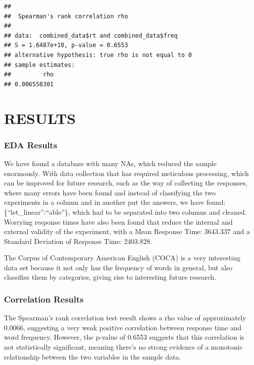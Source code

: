 \documentclass[
]{article}
\begin{document}
\begin{verbatim}
## 
##  Spearman's rank correlation rho
## 
## data:  combined_data$rt and combined_data$freq
## S = 1.6487e+10, p-value = 0.6553
## alternative hypothesis: true rho is not equal to 0
## sample estimates:
##         rho 
## 0.006558301
\end{verbatim}

\hypertarget{results}{%
\section{RESULTS}\label{results}}

\hypertarget{eda-results}{%
\subsubsection{EDA Results}\label{eda-results}}

We have found a database with many NAs, which reduced the sample
enormously. With data collection that has required meticulous
processing, which can be improved for future research, such as the way
of collecting the responses, where many errors have been found and
instead of classifying the two experiments in a column and in another
put the answers, we have found: \{``let\_linear'':``able''\}, which had
to be separated into two columns and cleaned. Worrying response times
have also been found that reduce the internal and external validity of
the experiment, with a Mean Response Time: 3643.337 and a Standard
Deviation of Response Time: 2403.828.

The Corpus of Contemporary American English (COCA) is a very interesting
data set because it not only has the frequency of words in general, but
also classifies them by categories, giving rise to interesting future
research.

\hypertarget{correlation-results}{%
\subsubsection{Correlation Results}\label{correlation-results}}

The Spearman's rank correlation test result shows a rho value of
approximately 0.0066, suggesting a very weak positive correlation
between response time and word frequency. However, the p-value of 0.6553
suggests that this correlation is not statistically significant, meaning
there's no strong evidence of a monotonic relationship between the two
variables in the sample data.
\end{document}

